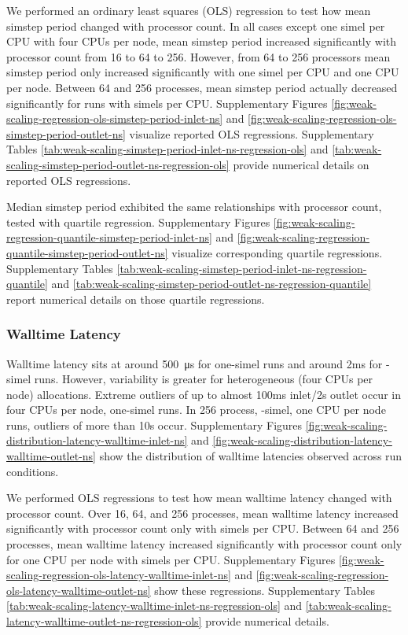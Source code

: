 We performed an ordinary least squares (OLS) regression to test how mean simstep period changed with processor count.
In all cases except one simel per CPU with four CPUs per node, mean simstep period increased significantly with processor count from 16 to 64 to 256.
However, from 64 to 256 processors mean simstep period only increased significantly with one simel per CPU and one CPU per node.
Between 64 and 256 processes, mean simstep period actually decreased significantly for runs with  simels per CPU.
Supplementary Figures \ref{fig:weak-scaling-regression-ols-simstep-period-inlet-ns} and \ref{fig:weak-scaling-regression-ols-simstep-period-outlet-ns} visualize reported OLS regressions.
Supplementary Tables \ref{tab:weak-scaling-simstep-period-inlet-ns-regression-ols} and \ref{tab:weak-scaling-simstep-period-outlet-ns-regression-ols} provide numerical details on reported OLS regressions.

Median simstep period exhibited the same relationships with processor count, tested with quartile regression.
Supplementary Figures \ref{fig:weak-scaling-regression-quantile-simstep-period-inlet-ns} and \ref{fig:weak-scaling-regression-quantile-simstep-period-outlet-ns} visualize corresponding quartile regressions.
Supplementary Tables \ref{tab:weak-scaling-simstep-period-inlet-ns-regression-quantile} and \ref{tab:weak-scaling-simstep-period-outlet-ns-regression-quantile} report numerical details on those quartile regressions.

\subsubsection{Walltime Latency}

Walltime latency sits at around \SI{500}{\micro\second} for one-simel runs and around 2ms for -simel runs.
However, variability is greater for heterogeneous (four CPUs per node) allocations.
Extreme outliers of up to almost 100ms inlet/2s outlet occur in four CPUs per node, one-simel runs.
In 256 process, -simel, one CPU per node runs, outliers of more than 10s occur.
Supplementary Figures \ref{fig:weak-scaling-distribution-latency-walltime-inlet-ns} and \ref{fig:weak-scaling-distribution-latency-walltime-outlet-ns} show the distribution of walltime latencies observed across run conditions.

We performed OLS regressions to test how mean walltime latency changed with processor count.
Over 16, 64, and 256 processes, mean walltime latency increased significantly with processor count only with  simels per CPU.
Between 64 and 256 processes, mean walltime latency increased significantly with processor count only for one CPU per node with  simels per CPU.
Supplementary Figures \ref{fig:weak-scaling-regression-ols-latency-walltime-inlet-ns} and \ref{fig:weak-scaling-regression-ols-latency-walltime-outlet-ns} show these regressions.
Supplementary Tables \ref{tab:weak-scaling-latency-walltime-inlet-ns-regression-ols} and \ref{tab:weak-scaling-latency-walltime-outlet-ns-regression-ols} provide numerical details.

